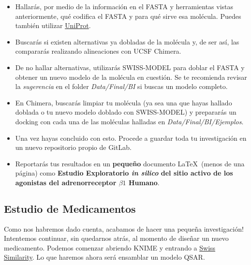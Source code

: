 \documentclass[10pt,letterpaper]{article}
\begin{document}
\begin{itemize}
\item Hallar\'as, por medio de la informaci\'on en el FASTA y herramientas vistas anteriormente, qu\'e codifica el FASTA y para qu\'e sirve esa mol\'ecula. Puedes tambi\'en utilizar \href{http://www.uniprot.org/}{UniProt}.
\item Buscar\'as si existen alternativas ya dobladas de la mol\'ecula y, de ser as\'i, las comparar\'as realizando alineaciones con UCSF Chimera.
\item De no hallar alternativas, utilizar\'as SWISS-MODEL para doblar el FASTA y obtener un nuevo modelo de la mol\'ecula en cuesti\'on. Se te recomienda revisar la \textit{sugerencia} en el folder \textit{Data/Final/BI} si buscas un modelo completo.
\item En Chimera, buscar\'as limpiar tu mol\'ecula (ya sea una que hayas hallado doblada o tu nuevo modelo doblado con SWISS-MODEL) y preparar\'as un docking con cada una de las mol\'eculas halladas en \textit{Data/Final/BI/Ejemplos}.
\item Una vez hayas concluido con esto. Procede a guardar toda tu investigaci\'on en un nuevo repositorio propio de GitLab.
\item Reportar\'as tus resultados en un \textbf{peque\~no} documento \LaTeX\ (menos de una p\'agina) como \textbf{Estudio Exploratorio \emph{in silico} del sitio activo de los agonistas del adrenorreceptor $\beta 1$ Humano}.
\end{itemize}

\subsection{Estudio de Medicamentos}
Como nos habremos dado cuenta, acabamos de hacer una peque\~na investigaci\'on! Intentemos continuar, sin quedarnos atr\'as, al momento de dise\~nar un nuevo medicamento. Podemos comenzar abriendo KNIME y entrando a \href{http://www.swisssimilarity.ch/}{Swiss  Similarity}. Lo que haremos ahora ser\'a ensamblar un modelo QSAR.\\
\end{document}
